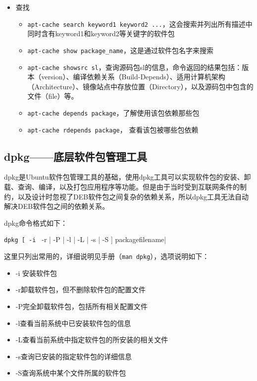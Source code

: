 \begin{itemize}
\item 查找
	\begin{itemize}
		\item \verb|apt-cache search keyword1 keyword2 ...|，这会搜索并列出所有描述中同时含有keyword1和keyword2等关键字的软件包
		\item \verb|apt-cache show package_name|，这是通过软件包名字来搜索
		\item \verb|apt-cache showsrc sl|，查询源码包sl的信息，命令返回的结果包括：版本（version）、编译依赖关系（Build-Depends）、适用计算机架构（Architecture）、镜像站点中存放位置（Directory），以及源码包中包含的文件（file）等。
		\item \verb|apt-cache depends package|，了解使用该包依赖那些包
		\item \verb|apt-cache rdepends package|， 查看该包被哪些包依赖
	\end{itemize}
\end{itemize}



\subsection{dpkg——底层软件包管理工具}
dpkg是Ubuntu软件包管理工具的基础，使用dpkg工具可以实现软件包的安装、卸载、查询、编译，以及打包应用程序等功能。但是由于当时受到互联网条件的制约，以及设计时忽视了DEB软件包之间复杂的依赖关系，所以dpkg工具无法自动解决DEB软件包之间的依赖关系。

dpkg命令格式如下：

\verb|dpkg [ -i | -r | -P | -l | -L | -s | -S ] packagefilename|

这里只列出常用的，详细说明见手册（\verb|man dpkg|），选项说明如下：
\begin{itemize}
\item -i 安装软件包

\item -r卸载软件包，但不删除软件包的配置文件

\item -P完全卸载软件包，包括所有相关配置文件

\item -l查看当前系统中已安装软件包的信息

\item -L查看当前系统中指定软件包的所安装的相关文件

\item -s查询已安装的指定软件包的详细信息

\item -S查询系统中某个文件所属的软件包
\end{itemize}

